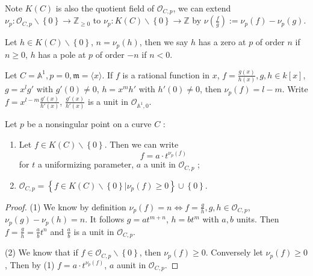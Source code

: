 \begin{definition}
  Note $K(C)$ is also the quotient field of $\mathcal{O}_{C,p}$, we can extend $\nu_p:\mathcal{O}_{C,p} \backslash \left\{0\right\} \to \mathbb{Z}_{\ge 0}$ to $\nu_p:K(C) \backslash \left\{0\right\} \to \mathbb{Z}$ by $\nu\left( \frac{f}{g} \right) :=\nu_p(f)-\nu_p(g)$.

  Let $h\in K(C)\backslash \left\{0\right\} $, $n=\nu_p(h)$, then we say $h$ has a zero at $p$ of order $n$ if $n\ge 0$, $h$ has a pole at $p$ of order $-n$ if $n<0$.
\end{definition}
\begin{example}
  Let $C=\mathbb{A}^{1},p= 0,\mathfrak{m}=\langle x\rangle$. If $f$ is a rational function in $x$, $f=\frac{g(x)}{h(x)},g,h\in k[x]$, $g=x^{l}g'$ with $g'(0)\neq 0$, $h=x^{m}h'$ with $h'(0)\neq 0$, then $\nu_p(f)=l-m$. Write $f=x^{l-m} \frac{g'(x)}{h'(x)}$, $\frac{g'(x)}{h'(x)}$ is a unit in $\mathcal{O}_{\mathbb{A}^{1},0}$.
\end{example}

\begin{proposition}
  Let $p$ be a nonsingular point on a curve $C$ :
  \begin{enumerate}
    \item Let $f\in K(C)\backslash \left\{0\right\} $. Then we can write 
      \[
	f=a\cdot t ^{\nu_p(f)}
      \] 
      for $t$ a uniformizing parameter, $a$ a unit in $\mathcal{O}_{C,p}$ ;
    \item $\mathcal{O}_{C,p}=\left\{f\in K(C) \backslash  \left\{0\right\}|\nu_p(f) \ge 0 \right\}\cup \left\{0\right\}  $.
  \end{enumerate}
  \begin{proof}
    (1) We know by definition $\nu_p(f)=n\Leftrightarrow f=\frac{g}{h},g,h \in \mathcal{O}_{C,p}$, $\nu_p(g)-\nu_p(h)=n$. It follows $g=at ^{m+n}$, $h=bt ^{m}$ with $a,b$ units. Then $f=\frac{g}{h}=\frac{a}{b}t ^{n}$ and $\frac{a}{b}$ is a unit in $\mathcal{O}_{C,p}$.

    (2) We know that if $f\in \mathcal{O}_{C,p}\backslash  \left\{0\right\} $, then $\nu_p(f)\ge 0$. Conversely let $\nu_p(f)\ge 0$, Then by (1) $f=a \cdot t ^{\nu_p(f)}$, $a$ aunit in $\mathcal{O}_{C,p}$.
  \end{proof}
\end{proposition}
 
